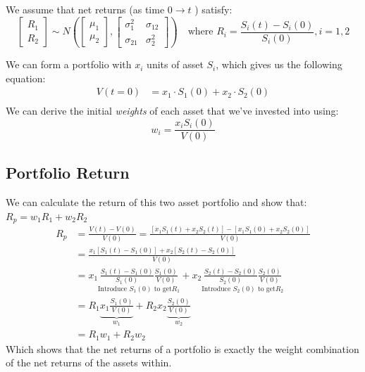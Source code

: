 \documentclass[
  oneside]{book}
\begin{document}
We assume that net returns (as time \(0\to t\) ) satisfy:
\[
\left[\begin{array}{c}
R_{1} \\
R_{2}
\end{array}\right] \sim 
N \left( 
\left[ \begin{array}{c}
\mu_{1} \\
\mu_{2}
\end{array} 
\right],
\left[
\begin{array}{cc}
\sigma_{1}^{2}  & \sigma_{12} \\
\sigma_{21}  & \sigma^{2}_{2}
\end{array} \right] 
\right) \quad 
\text{where } R_{i} = \frac{S_{i}(t)-S_{i}(0)}{S_{i}(0)}, i = 1,2
\]

We can form a portfolio with \(x_{i}\) units of asset \(S_{i}\), which gives us the following equation:
\[
\begin{aligned}
V(t=0) &= x_{1}\cdot S_{1}(0)+x_{2}\cdot S_{2}(0)\\
\end{aligned}
\]
We can derive the initial \emph{weights} of each asset that we've invested into using:
\[
w_{i} = \frac{x_{i}S_{i}(0)}{V(0)}
\]

\hypertarget{portfolio-return}{%
\subsection{Portfolio Return}\label{portfolio-return}}

We can calculate the return of this two asset portfolio and show that: \(R_{p} = w_{1}R_{1}+w_{2}R_{2}\)
\[
\begin{aligned}
R_{p} &= \frac{V(t)-V(0)}{V(0)} = \frac{[x_{1}S_{1}(t)+x_{2}S_{2}(t)]-[x_{1}S_{1}(0)+x_{2}S_{2}(0)]}{V(0)}\\
&= \frac{x_{1}[S_{1}(t)-S_{1}(0)]+x_{2}[S_{2}(t)-S_{2}(0)]}{V(0)}\\
&= x_{1} \underset{ \text{Introduce }S_{1}(0) \text{ to get} R_{1}}{ \frac{S_{1}(t)-S_{1}(0)}{S_{1}(0)} \frac{S_{1}(0)}{V(0)} } + x_{2} \underset{  \text{Introduce }S_{2}(0) \text{ to get} R_{2} }{ \frac{S_{2}(t)-S_{2}(0)}{S_{2}(0)} \frac{S_{2}(0)}{V(0)} }\\
&= R_{1} \underbrace{ x_{1}\frac{S_{1}(0)}{V(0)} }_{ w_{1} }+R_{2} x_{2}\underbrace{ \frac{S_{2}(0)}{V(0)} }_{ w_{2} }\\
&= R_{1}w_{1}+R_{2}w_{2}
\end{aligned}
\]
Which shows that the net returns of a portfolio is exactly the weight combination of the net returns of the assets within.
\end{document}
